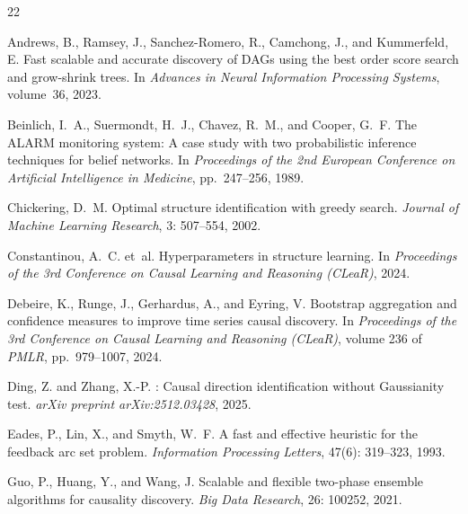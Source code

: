 \documentclass{article}
\begin{document}
\begin{thebibliography}{22}

Andrews, B., Ramsey, J., Sanchez-Romero, R., Camchong, J., and Kummerfeld, E.
\newblock Fast scalable and accurate discovery of {DAG}s using the best order score search and grow-shrink trees.
\newblock In \emph{Advances in Neural Information Processing Systems}, volume~36, 2023.

Beinlich, I.~A., Suermondt, H.~J., Chavez, R.~M., and Cooper, G.~F.
\newblock The {ALARM} monitoring system: A case study with two probabilistic inference techniques for belief networks.
\newblock In \emph{Proceedings of the 2nd European Conference on Artificial Intelligence in Medicine}, pp.~247--256, 1989.

Chickering, D.~M.
\newblock Optimal structure identification with greedy search.
\newblock \emph{Journal of Machine Learning Research}, 3: 507--554, 2002.

Constantinou, A.~C. et~al.
\newblock Hyperparameters in structure learning.
\newblock In \emph{Proceedings of the 3rd Conference on Causal Learning and Reasoning (CLeaR)}, 2024.

Debeire, K., Runge, J., Gerhardus, A., and Eyring, V.
\newblock Bootstrap aggregation and confidence measures to improve time series causal discovery.
\newblock In \emph{Proceedings of the 3rd Conference on Causal Learning and Reasoning (CLeaR)}, volume 236 of \emph{PMLR}, pp.~979--1007, 2024.

Ding, Z. and Zhang, X.-P.
: Causal direction identification without {G}aussianity test.
\newblock \emph{arXiv preprint arXiv:2512.03428}, 2025.

Eades, P., Lin, X., and Smyth, W.~F.
\newblock A fast and effective heuristic for the feedback arc set problem.
\newblock \emph{Information Processing Letters}, 47(6): 319--323, 1993.

Guo, P., Huang, Y., and Wang, J.
\newblock Scalable and flexible two-phase ensemble algorithms for causality discovery.
\newblock \emph{Big Data Research}, 26: 100252, 2021.


\end{thebibliography}
\end{document}
